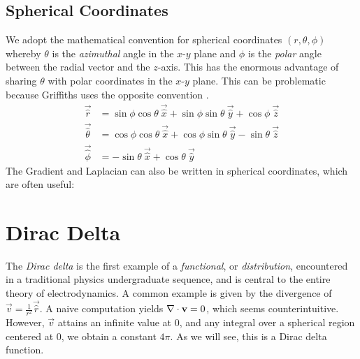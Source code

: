 \subsection{Spherical Coordinates}
We adopt the mathematical convention for spherical coordinates $(r, \theta, \phi)$ whereby $\theta$ is the \textit{azimuthal} angle in the $x$-$y$ plane and $\phi$ is the \textit{polar} angle between the radial vector and the $z$-axis. This has the enormous advantage of sharing $\theta$ with polar coordinates in the $x$-$y$ plane. This can be problematic because Griffiths uses the opposite convention \cite{griffithsIntroductionElectrodynamics2018}.
\begin{align}
	\vec{\hat{r}} &= \sin\phi\cos\theta\ \vec{\hat{x}} + \sin\phi\sin\theta\ \vec{\hat{y}} + \cos\phi\ \vec{\hat{z}} \\
	\vec{\hat{\theta}} &= \cos\phi\cos\theta\ \vec{\hat{x}} + \cos\phi\sin\theta\ \vec{\hat{y}} - \sin\theta\ \vec{\hat{z}} \\
	\vec{\hat{\phi}} &= - \sin\theta\ \vec{\hat{x}} + \cos\theta\ \vec{\hat{y}}
\end{align}
The Gradient and Laplacian can also be written in spherical coordinates, which are often useful:

\section{Dirac Delta}
The \textit{Dirac delta} is the first example of a \textit{functional}, or \textit{distribution}, encountered in a traditional physics undergraduate sequence, and is central to the entire theory of electrodynamics. A common example is given by the divergence of $\vec{v} = \frac{1}{r^2} \vec{\hat{r}}$. A naive computation yields $\nabla \cdot \boldsymbol{\mathbf{v}} = 0$, which seems counterintuitive. However, $\vec{v}$ attains an infinite value at $0$, and any integral over a spherical region centered at $0$, we obtain a constant $4\pi$. As we will see, this is a Dirac delta function.
